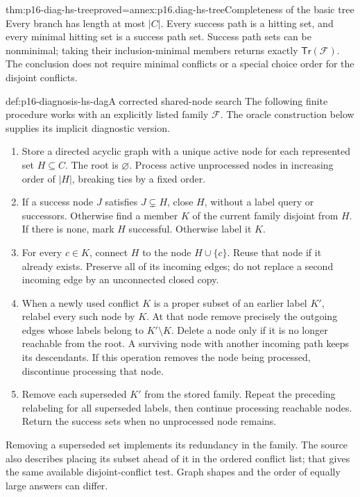 \begin{hbtheorem}{thm:p16-diag-hs-tree}{proved=annex:p16.diag-hs-tree}{Completeness of the basic tree}
Every branch has length at most \(|C|\). Every success path
is a hitting set, and every minimal hitting set is a success
path set. Success path sets can be nonminimal; taking their
inclusion-minimal members returns exactly
\(\mathsf{Tr}(\mathcal F)\).
The conclusion does not require minimal conflicts or a special
choice order for the disjoint conflicts.
\end{hbtheorem}

\begin{hbdefinition}{def:p16-diagnosis-hs-dag}{A corrected shared-node search}
The following finite procedure works with an explicitly listed
family \(\mathcal F\). The oracle construction below supplies
its implicit diagnostic version.
\begin{enumerate}
\item Store a directed acyclic graph with a unique active node
      for each represented set \(H\subseteq C\). The root is
      \(\varnothing\). Process active unprocessed nodes in
      increasing order of \(|H|\), breaking ties by a fixed order.
\item If a success node \(J\) satisfies \(J\subsetneq H\),
      close \(H\), without a label query or successors.
      Otherwise find a member \(K\) of the current family
      disjoint from \(H\). If there is none, mark \(H\)
      successful. Otherwise label it \(K\).
\item For every \(c\in K\), connect \(H\) to the node
      \(H\cup\{c\}\). Reuse that node if it already exists.
      Preserve all of its incoming edges; do not replace a
      second incoming edge by an unconnected closed copy.
\item When a newly used conflict \(K\) is a proper subset of
      an earlier label \(K'\), relabel every such node by \(K\).
      At that node remove precisely the outgoing edges whose
      labels belong to \(K'\setminus K\). Delete a node only
      if it is no longer reachable from the root. A surviving
      node with another incoming path keeps its descendants.
      If this operation removes the node being processed,
      discontinue processing that node.
\item Remove each superseded \(K'\) from the stored family.
      Repeat the preceding relabeling for all superseded
      labels, then continue processing reachable nodes.
      Return the success sets when no unprocessed node remains.
\end{enumerate}
Removing a superseded set implements its redundancy in the
family. The source also describes placing its subset ahead of
it in the ordered conflict list; that gives the same available
disjoint-conflict test. Graph shapes and the order of equally
large answers can differ.
\end{hbdefinition}

